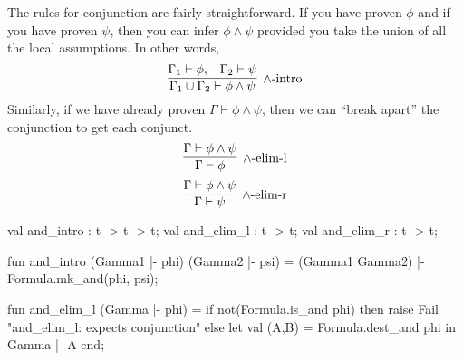 \begin{node}
The rules for conjunction are fairly straightforward. If you have
proven $\phi$ and if you have proven $\psi$, then you can infer
$\phi\land\psi$ provided you take the union of all the local
assumptions. In other words,
\begin{equation}
\vcenter{\infer[\land\mbox{-intro}]{\Gamma_{1}\cup\Gamma_{2}\vdash\phi\land\psi}{\Gamma_{1}\vdash\phi,&\Gamma_{2}\vdash\psi}}
\end{equation}
Similarly, if we have already proven $\Gamma\vdash\phi\land\psi$, then
we can ``break apart'' the conjunction to get each conjunct.
\begin{equation}
\vcenter{\infer[\land\mbox{-elim-l}]{\Gamma\vdash\phi}{\Gamma\vdash\phi\land\psi}}
\end{equation}
\begin{equation}
\vcenter{\infer[\land\mbox{-elim-r}]{\Gamma\vdash\psi}{\Gamma\vdash\phi\land\psi}}
\end{equation}
\end{node}

\nwenddocs{}\plusendmoddef\nwstartdeflinemarkup{}\nwenddeflinemarkup
val and_intro : t -> t -> t;
val and_elim_l : t -> t;
val and_elim_r : t -> t;
\nwendcode{}\nwdocspar

\nwenddocs{}\plusendmoddef\nwstartdeflinemarkup{}\nwenddeflinemarkup
fun and_intro (Gamma1 |- phi) (Gamma2 |- psi) =
  (Gamma1  Gamma2) |- Formula.mk_and(phi, psi);

fun and_elim_l (Gamma |- phi) =
  if not(Formula.is_and phi)
  then raise Fail "and_elim_l: expects conjunction"
  else
    let val (A,B) = Formula.dest_and phi
    in Gamma |- A end;

